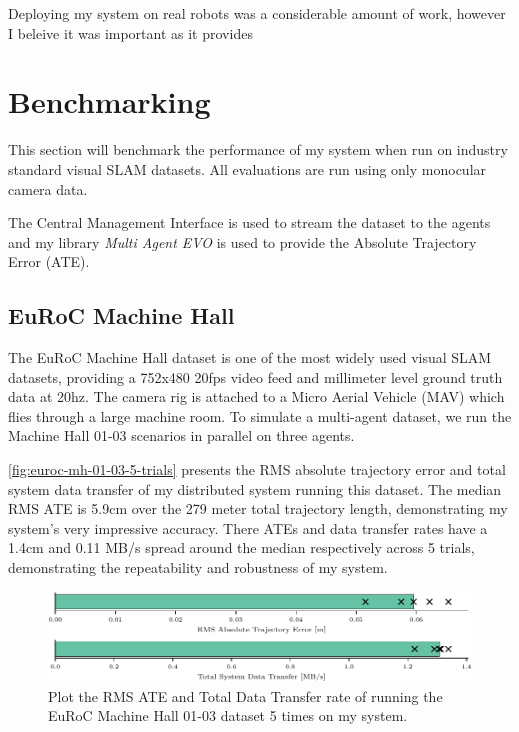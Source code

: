 Deploying my system on real robots was a considerable amount of work, however I beleive it was important as it provides

\section{Benchmarking}
\label{sec:benchmarking}
This section will benchmark the performance of my system when run on industry standard visual SLAM datasets. All evaluations are run using only monocular camera data.

The Central Management Interface is used to stream the dataset to the agents and my library \textit{Multi Agent EVO} is used to provide the Absolute Trajectory Error (ATE).

\subsection{EuRoC Machine Hall}
\label{sec:euroc-machine-hall}
The EuRoC Machine Hall dataset \autocite{burri2016euroc} is one of the most widely used visual SLAM datasets, providing a 752x480 20fps video feed and millimeter level ground truth data at 20hz. The camera rig is attached to a Micro Aerial Vehicle (MAV) which flies through a large machine room. To simulate a multi-agent dataset, we run the Machine Hall 01-03 scenarios in parallel on three agents.


\autoref{fig:euroc-mh-01-03-5-trials} presents the RMS absolute trajectory error and total system data transfer of my distributed system running this dataset. The median RMS ATE is 5.9cm over the 279 meter total trajectory length, demonstrating my system's very impressive accuracy. There ATEs and data transfer rates have a 1.4cm and 0.11 MB/s spread around the median respectively across 5 trials, demonstrating the repeatability and robustness of my system.

\begin{figure}[h]
    \centering
    \includegraphics[width=\linewidth]{figures/comparison_apr11_mh_trajectory_b.pdf}

    \caption{Plot the RMS ATE and Total Data Transfer rate of running the EuRoC Machine Hall 01-03 dataset 5 times on my system.}
    \label{fig:euroc-mh-01-03-5-trials}
\end{figure}

